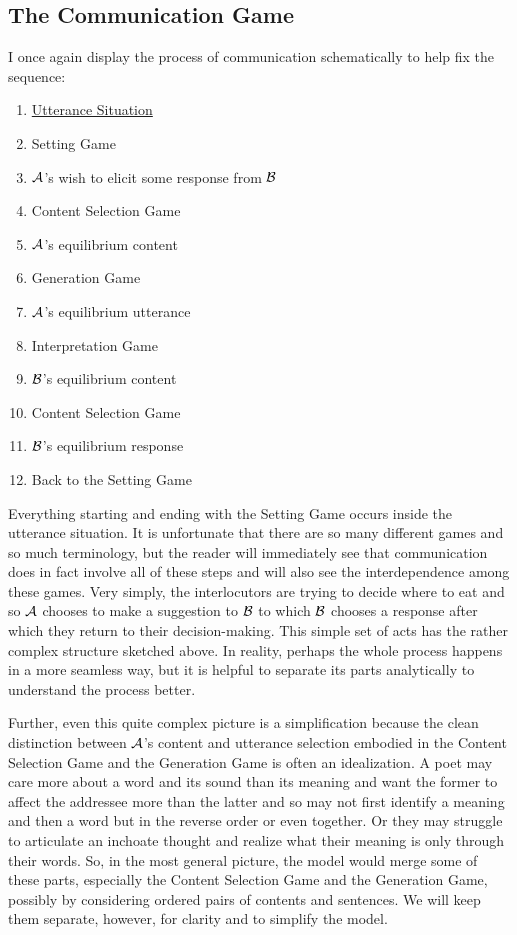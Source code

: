 \subsection{The Communication Game} 

I once again display the process of communication schematically to help fix the sequence:
\begin{enumerate}[itemsep=0pt]
\item[] \underline{Utterance Situation} 
\item[] Setting Game
\item[\functionarrow] $\cal A$'s wish to elicit some response from $\cal B$
\item[\functionarrow] Content Selection Game
\item[\functionarrow] $\cal A$'s equilibrium content
\item[\functionarrow] Generation Game
\item[\functionarrow] $\cal A$'s equilibrium utterance
\item[\functionarrow] Interpretation Game
\item[\functionarrow] $\cal B$'s equilibrium content
\item[\functionarrow] Content Selection Game
\item[\functionarrow] $\cal B$'s equilibrium response
\item[\functionarrow] Back to the Setting Game
\end{enumerate}
Everything starting and ending with the Setting Game occurs inside the utterance situation. It is unfortunate that there are so many different games and so much terminology, but the reader will immediately see that communication does in fact involve all of these steps and will also see the interdependence among these games. Very simply, the interlocutors are trying to decide where to eat and so $\cal A$ chooses to make a suggestion to $\cal B$ to which $\cal B$ chooses a response after which they return to their decision-making. This simple set of acts has the rather complex structure sketched above. In reality, perhaps the whole process happens in a more seamless way, but it is helpful to separate its parts analytically to understand the process better.\largerpage[-1]

Further, even this quite complex picture is a simplification because the clean distinction between $\cal A$'s content and utterance selection embodied in the Content Selection Game and the Generation Game is often an idealization.\label{page:idealization} A poet may care more about a word and its sound than its meaning and want the former to affect the addressee more than the latter and so may not first identify a meaning and then a word but in the reverse order or even together. Or they may struggle to articulate an inchoate thought and realize what their meaning is only through their words. So, in the most general picture, the model would merge some of these parts, especially the Content Selection Game and the Generation Game, possibly by considering ordered pairs of contents and sentences. We will keep them separate, however, for clarity and to simplify the model.

